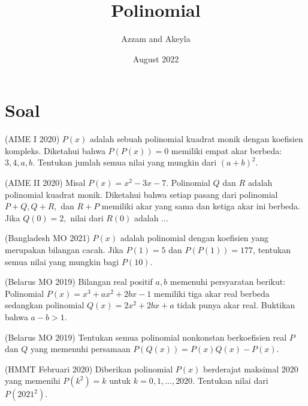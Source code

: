 \documentclass[11pt]{scrartcl}
\title{Polinomial}
\author{Azzam and Akeyla}
\date{August 2022}
\begin{document}
\maketitle

\renewcommand*\contentsname{Daftar Isi}
\tableofcontents

\newpage
\section{Soal}

\begin{problem}
(AIME I 2020) $P(x)$ adalah sebuah polinomial kuadrat monik dengan koefisien kompleks. Diketahui bahwa $P(P(x)) = 0$ memiliki empat akar berbeda: $3, 4, a, b$. Tentukan jumlah semua nilai yang mungkin dari $(a + b)^2$.
\end{problem}

\begin{problem}
(AIME II 2020) Misal $P(x) = x^2 - 3x - 7$. Polinomial $Q$ dan $R$ adalah polinomial kuadrat monik. Diketahui bahwa setiap pasang dari polinomial $P+Q, Q+R, $  dan $R+P$ memiliki akar yang sama dan ketiga akar ini berbeda. Jika $Q(0) = 2,$ nilai dari $R(0)$ adalah ... 
\end{problem}

\begin{problem}
(Bangladesh MO 2021) $P(x)$ adalah polinomial dengan koefisien yang merupakan bilangan cacah. Jika $P(1) = 5$ dan $P(P(1)) = 177$, tentukan semua nilai yang mungkin bagi $P(10)$.
\end{problem}

\begin{problem}
(Belarus MO 2019) Bilangan real positif $a, b$ memenuhi persyaratan berikut: Polinomial $P(x) = x^3 + ax^2 + 2bx - 1$ memiliki tiga akar real berbeda sedangkan polinomial $Q(x) = 2x^2 + 2bx + a$ tidak punya akar real. Buktikan bahwa $a - b > 1$. 
\end{problem}

\begin{problem}
(Belarus MO 2019) Tentukan semua polinomial nonkonstan berkoefisien real $P$ dan $Q$ yang memenuhi persamaan $P(Q(x)) = P(x)Q(x) - P(x)$.
\end{problem}

\begin{problem}
(HMMT Februari 2020) Diberikan polinomial $P(x)$ berderajat maksimal $2020$ yang memenihi $P(k^2) = k$ untuk $k = 0, 1, ..., 2020$. Tentukan nilai dari $P(2021^2)$.
\end{problem}
\end{document}
